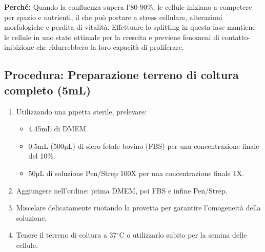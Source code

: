 \begin{percheBox}
\footnotesize{  \textbf{Perché:} Quando la confluenza supera l’80-90\%, le cellule iniziano a competere per spazio e nutrienti, il che può portare a stress cellulare, alterazioni morfologiche e perdita di vitalità. Effettuare lo splitting in questa fase mantiene le cellule in uno stato ottimale per la crescita e previene fenomeni di contatto-inibizione che ridurrebbero la loro capacità di proliferare.}
\end{percheBox}

\subsection{Procedura: Preparazione terreno di coltura completo (5mL)}
\begin{enumerate}\footnotesize
  \item Utilizzando una pipetta sterile, prelevare:
  \begin{itemize}
    \item 4.45mL di DMEM.
    \item 0.5mL (500µL) di siero fetale bovino (FBS) per una concentrazione finale del 10\%.
    \item 50µL di soluzione Pen/Strep 100X per una concentrazione finale 1X.
  \end{itemize}
  \item Aggiungere nell’ordine: prima DMEM, poi FBS e infine Pen/Strep.
  \item Miscelare delicatamente ruotando la provetta per garantire l’omogeneità della soluzione.
  \item Tenere il terreno di coltura a 37$^\circ$C o utilizzarlo subito per la semina delle cellule.
\end{enumerate}

